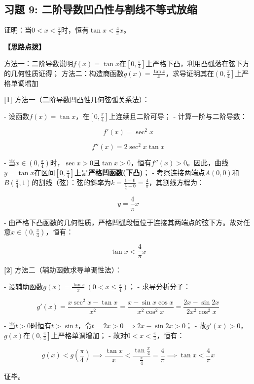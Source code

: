 \documentclass[11pt,a4paper,UTF8]{ctexart}
\begin{document}
\subsection{习题 9: 二阶导数凹凸性与割线不等式放缩}

证明：当$0 < x < \frac{\pi}{4}$时，恒有$\tan x < \frac{4}{\pi}x$。

\textbf{\color{DeepPurple}【思路点拨】} 

方法一：二阶导数说明$f(x) = \tan x$在$\left[0, \frac{\pi}{4}\right]$上严格下凸，利用凸弧落在弦下方的几何性质证得；
方法二：构造商函数$g(x) = \frac{\tan x}{x}$，求导证明其在$\left(0, \frac{\pi}{4}\right]$上严格单调增加

\begin{solbox}[分步推导与答题规范]
\textbf{[1]} 方法一（二阶导数凹凸性几何弦弧关系法）：

- 设函数$f(x) = \tan x$，在$\left[0, \frac{\pi}{4}\right]$上连续且二阶可导；
- 计算一阶与二阶导数：

 
\begin{equation*}
f'(x) = \sec^2 x
\end{equation*}

 
\begin{equation*}
f''(x) = 2\sec^2 x \tan x
\end{equation*}


- 当$x \in \left(0, \frac{\pi}{4}\right)$时，$\sec x > 0$且$\tan x > 0$，恒有$f''(x) > 0$。因此，曲线$y = \tan x$在区间$\left[0, \frac{\pi}{4}\right]$上是\textbf{严格凹函数(下凸)}；
- 考察连接两端点$A(0, 0)$和$B\left(\frac{\pi}{4}, 1\right)$的割线（弦）：弦的斜率为$k = \frac{1 - 0}{\frac{\pi}{4} - 0} = \frac{4}{\pi}$，其割线方程为：

 
\begin{equation*}
y = \frac{4}{\pi}x
\end{equation*}


- 由严格下凸函数的几何性质，严格凹弧段恒位于连接其两端点的弦下方。故对任意$x \in \left(0, \frac{\pi}{4}\right)$，恒有：

 
\begin{equation*}
\tan x < \frac{4}{\pi}x
\end{equation*}


\textbf{[2]} 方法二（辅助函数求导单调性法）：

- 设辅助函数$g(x) = \frac{\tan x}{x} \ \left(0 < x \le \frac{\pi}{4}\right)$；
- 求导分析分子：

 
\begin{equation*}
g'(x) = \frac{x\sec^2 x - \tan x}{x^2} = \frac{x - \sin x\cos x}{x^2\cos^2 x} = \frac{2x - \sin 2x}{2x^2\cos^2 x}
\end{equation*}


- 当$t > 0$时恒有$t > \sin t$，令$t = 2x > 0 \implies 2x - \sin 2x > 0$；
- 故$g'(x) > 0$，$g(x)$在$\left(0, \frac{\pi}{4}\right]$上严格单调增加；
- 故对$0 < x < \frac{\pi}{4}$，恒有：

 
\begin{equation*}
g(x) < g\left(\frac{\pi}{4}\right) \implies \frac{\tan x}{x} < \frac{\tan\frac{\pi}{4}}{\frac{\pi}{4}} = \frac{4}{\pi} \implies \tan x < \frac{4}{\pi}x
\end{equation*}


证毕。
\end{solbox}
\end{document}
